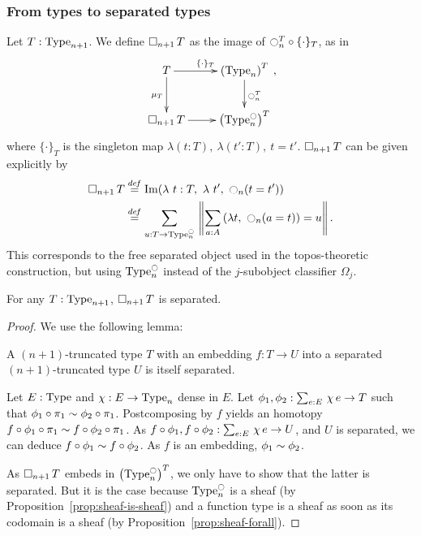\subsubsection{From types to separated types}
\label{sssec:type_to_sep}


Let $T : \operatorname{Type}_{n+1}$. We define $\mathop{\square_{n+1}} T$ as the image of
$\ocircle_n^T \circ \{\cdot\}_T$, as in
\[\xymatrix{
    T \ar[r]^{\{\cdot\}_T} \ar[d]_{\mu_T} & \left(\Type_n\right)^T \ar[d]^{\modal_n^T} \\
  \separated T \ar[r]& \left( \Type_n^\modal \right)^T
}, \]%
where $\{\cdot\}_T$ is the singleton map $\lambda (t:T),~\lambda
(t':T),~t=t'$. 
%
$\mathop{\square_{n+1}} T$ can be given explicitly by
%
\begin{align*}
\mathop{\square_{n+1}} T &\overset{de\hspace{-0.2ex}f}{=} \operatorname{Im} (\lambda~t:T,~\lambda~ t',~ \ocircle_n (t = t')) \\
          &\overset{de\hspace{-0.2ex}f}{=} \sum_{u:T \to \operatorname{Type}_n^{\ocircle}}\, \left\| \sum_{a:A}\, (\lambda t,~\ocircle_n (a=t)) = u\right\|.
\end{align*}
%
This corresponds to the free separated object used in the topos-theoretic construction, but using $\operatorname{Type}_n^{\ocircle}$ instead of the
$j$-subobject classifier $\Omega_j$.
%
\begin{prop}
  For any $T:\operatorname{Type}_{n+1}$, $\mathop{\square_{n+1}} T$ is separated.  
\end{prop}

\begin{proof}
We use the following lemma:
\begin{lem}\label{lem:embed-sep}
  A $(n+1)$-truncated type $T$ with an embedding $f : T \to U$
  into a separated $(n+1)$-truncated type $U$ is itself separated.
\end{lem}
\begin{prooflem}
  Let $E:\operatorname{Type}$ and $\chi:E\to\operatorname{Type}_n$ dense in $E$. Let
  $\phi_1,\phi_2:\sum_{e:E}\, \chi\, e \to T$ such that $\phi_1 \circ
  \pi_1 \sim \phi_2 \circ \pi_1$. Postcomposing by $f$ yields an homotopy $f \circ \phi_1 \circ
  \pi_1 \sim f \circ \phi_2 \circ \pi_1$. As $f\circ\phi_1,f\circ
  \phi_2 : \sum_{e:E}\, \chi\, e \to U$, and $U$ is separated, we can
  deduce $f \circ \phi_1 \sim f \circ \phi_2$. As $f$ is an
  embedding, $\phi_1 \sim \phi_2$.
\end{prooflem}
As $\mathop{\square_{n+1}} T$ embeds in $\left( \operatorname{Type}_n^{\ocircle} \right)^T$, we only
have to show that the latter is separated. But it is the case because
$\operatorname{Type}_n^{\ocircle}$ is a sheaf (by Proposition~\ref{prop:sheaf-is-sheaf})
and a function type is a sheaf as soon
as its codomain is a sheaf (by Proposition~\ref{prop:sheaf-forall}).
\end{proof}

